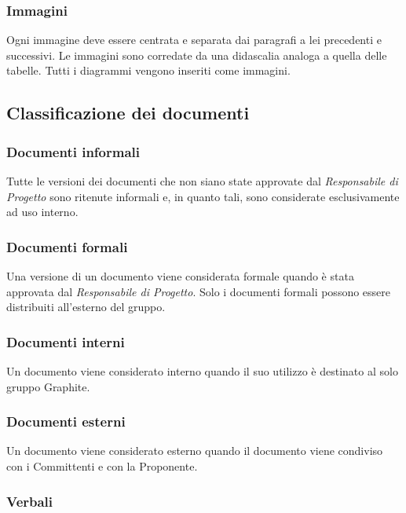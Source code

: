 \documentclass[../NormediProgetto.tex]{subfiles}
\begin{document}
\subsubsection{Immagini}

Ogni immagine deve essere centrata e separata dai paragrafi a lei precedenti e successivi. Le immagini sono corredate da una didascalia analoga a quella delle tabelle. Tutti i diagrammi vengono inseriti come immagini.

\subsection{Classificazione dei documenti}

\subsubsection{Documenti informali}

Tutte le versioni dei documenti che non siano state approvate dal \textit{Responsabile di Progetto} sono ritenute informali e, in quanto tali, sono considerate esclusivamente ad uso interno.

\subsubsection{Documenti formali}

Una versione di un documento viene considerata formale quando è stata approvata dal \textit{Responsabile di Progetto}. Solo i documenti formali possono essere distribuiti all’esterno del gruppo.

\subsubsection{Documenti interni}

Un documento viene considerato interno quando il suo utilizzo è destinato al solo gruppo Graphite.

\subsubsection{Documenti esterni}

Un documento viene considerato esterno quando il documento viene condiviso con i Committenti e con la Proponente.

\subsubsection{Verbali}
\end{document}
